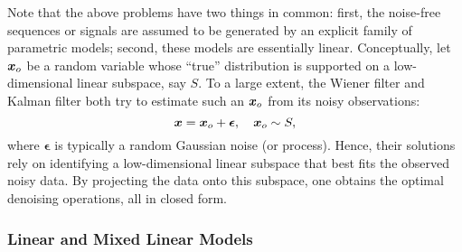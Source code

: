 \documentclass[../../book-main.tex]{subfiles}
\begin{document}
Note that the above problems have two things in common: first, the noise-free sequences or signals are assumed to be generated by an explicit family of parametric models; second, these models are essentially linear. Conceptually, let $\bm{x}_o$ be a random variable whose ``true'' distribution is supported on a low-dimensional linear subspace, say $S$. To a large extent, the Wiener filter and Kalman filter both try to estimate such an $\bm{x}_o$ from its noisy observations:
\begin{equation}
    \bm{x} = \bm{x}_o + \boldsymbol{\epsilon}, \quad \bm{x}_o \sim S,
\end{equation}
where $\boldsymbol{\epsilon}$ is typically a random Gaussian noise (or process). Hence, their solutions rely on identifying a low-dimensional linear subspace that best fits the observed noisy data. By projecting the data onto this subspace, one obtains the optimal denoising operations, all in closed form.


\subsubsection{Linear and Mixed Linear Models}
\label{sec:PCA-ICA}
\end{document}
